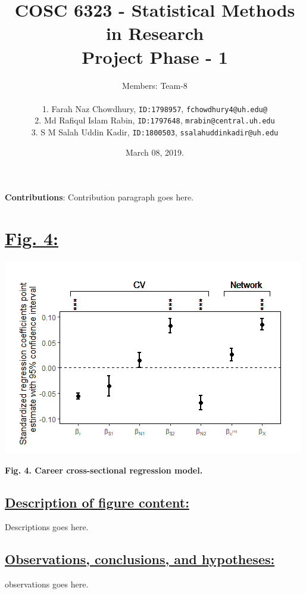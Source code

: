 \documentclass{article}\usepackage[]{graphicx}\usepackage[]{color}
\title{COSC 6323 - Statistical Methods in Research\\Project Phase - 1\\}
\author{%
    Members: Team-8 \\\\
    1. Farah Naz Chowdhury, \texttt  {ID:1798957}, \texttt{fchowdhury4@uh.edu@}\vspace{2pt} \\
    2. Md Rafiqul Islam Rabin, \texttt{ID:1797648}, \texttt{mrabin@central.uh.edu}\vspace{2pt} \\
    3. S M Salah Uddin Kadir, \texttt{ID:1800503}, \texttt{ssalahuddinkadir@uh.edu}\vspace{2pt} \\
}
\date{March 08, 2019.}
\begin{document}
\maketitle
\par{\textbf{Contributions}: Contribution paragraph goes here.}

\newpage
\section*{\underline{Fig. 4:}}
\begin{center}
\includegraphics[scale=0.8]{4.png}
\newline
\par{\textbf{Fig. 4. Career cross-sectional regression model.}}
\end{center}
\subsection*{\underline{Description of figure content:}}
\par{
Descriptions goes here.
}
\subsection*{\underline{Observations, conclusions, and hypotheses:}}
\par{
observations goes here.
}

\newpage
\end{document}
